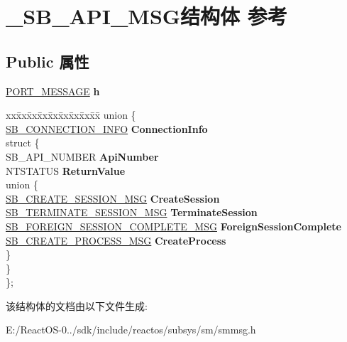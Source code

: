 \hypertarget{struct___s_b___a_p_i___m_s_g}{}\section{\+\_\+\+S\+B\+\_\+\+A\+P\+I\+\_\+\+M\+S\+G结构体 参考}
\label{struct___s_b___a_p_i___m_s_g}
\subsection*{Public 属性}
\begin{DoxyCompactItemize}
\item 
\mbox{\label{struct___s_b___a_p_i___m_s_g_ac998d8f9437752b22277962440d8d2de}} 
\hyperlink{struct___p_o_r_t___m_e_s_s_a_g_e___h_e_a_d_e_r}{P\+O\+R\+T\+\_\+\+M\+E\+S\+S\+A\+GE} {\bfseries h}
\item 
\mbox{\label{struct___s_b___a_p_i___m_s_g_a409a4241a55ad2cce1d0a1fcf472346b}} 
\begin{tabbing}
xx\=xx\=xx\=xx\=xx\=xx\=xx\=xx\=xx\=\kill
union \{\\
\>\hyperlink{struct___s_b___c_o_n_n_e_c_t_i_o_n___i_n_f_o}{SB\_CONNECTION\_INFO} {\bfseries ConnectionInfo}\\
\mbox{\label{union___s_b___a_p_i___m_s_g_1_1_0D3044_aacd81f930cc103b146fac4f3c41a6def}} 
\>struct \{\\
\>\>SB\_API\_NUMBER {\bfseries ApiNumber}\\
\>\>NTSTATUS {\bfseries ReturnValue}\\
\mbox{\label{struct___s_b___a_p_i___m_s_g_1_1_0D3044_1_1_0D3046_a5bb5ace0297ba01aa8a90ee0d2da66d1}} 
\>\>union \{\\
\>\>\>\hyperlink{struct___s_b___c_r_e_a_t_e___s_e_s_s_i_o_n___m_s_g}{SB\_CREATE\_SESSION\_MSG} {\bfseries CreateSession}\\
\>\>\>\hyperlink{struct___s_b___t_e_r_m_i_n_a_t_e___s_e_s_s_i_o_n___m_s_g}{SB\_TERMINATE\_SESSION\_MSG} {\bfseries TerminateSession}\\
\>\>\>\hyperlink{struct___s_b___f_o_r_e_i_g_n___s_e_s_s_i_o_n___c_o_m_p_l_e_t_e___m_s_g}{SB\_FOREIGN\_SESSION\_COMPLETE\_MSG} {\bfseries ForeignSessionComplete}\\
\>\>\>\hyperlink{struct___s_b___c_r_e_a_t_e___p_r_o_c_e_s_s___m_s_g}{SB\_CREATE\_PROCESS\_MSG} {\bfseries CreateProcess}\\
\>\>\} \\
\>\} \\
\}; \\

\end{tabbing}\end{DoxyCompactItemize}


该结构体的文档由以下文件生成\+:\begin{DoxyCompactItemize}
\item 
E\+:/\+React\+O\+S-\/0../sdk/include/reactos/subsys/sm/smmsg.\+h\end{DoxyCompactItemize}
